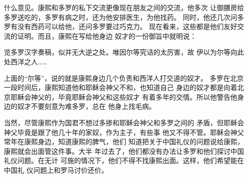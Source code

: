 什么意见。康熙和多罗的私下交流更像现在朋友之间的交流，他多次%
让御膳房给多罗送吃的，多罗有病之时，还为他安排医生，为他找药。%
同时，他还几次问多罗有没有西药可以给他，还问多罗要过巧克力。%
现在看来，这些都是他们友好交流的证明。而且，康熙在写给他身边%
奴才的一份御旨中就明说：%
\par
{\bookkai 览多罗汉字奏稿，似并无大逆之处。唯因尔等究诘的太厉害，故}%
{\bookkai 伊以为尔等向此处西洋之人……}%
\par
上面的“尔等”，说的就是康熙身边几个负责和西洋人打交道的奴才。%
多罗在北京一段时间后，康熙知道他和耶稣会神父不和，也知道自己%
身边的奴才都是向着北京耶稣会神父的，毕竟耶稣会神父和这些奴才%
有着多年的交情。所以他警告他身边的奴才不要刻意为难多罗，总在%
他身上找毛病。%
\par
当然，尽管康熙作为国君不想过多掺和耶稣会神父和多罗之间的%
矛盾，但耶稣会神父毕竟是跟了他几十年的家奴，作为主子，有些事%
他又不得不管。耶稣会神父常年在康熙身边，知道康熙的脾气，他们%
知道把关于中国礼仪的问题说给康熙，康熙就会出面管这件事。大半%
年过去了，他们都没有办法让多罗和他们探讨中国礼仪问题。在无计%
可施的情况下，他们不得不找康熙出面。这样，他们希望能在中国礼%
仪问题上和罗马讨价还价。%
